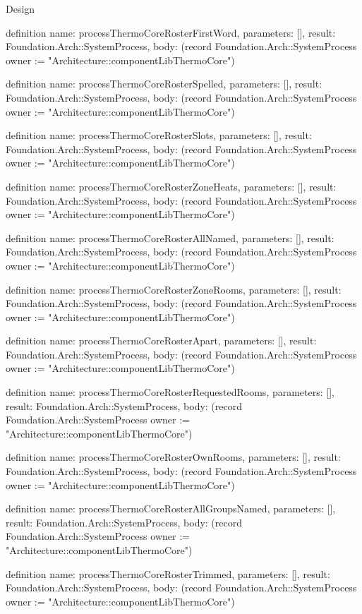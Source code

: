\begin{lexlean}{Design}
\begin{semanticmodule}
definition{
  name: processThermoCoreRosterFirstWord,
  parameters: [],
  result: Foundation.Arch::SystemProcess,
  body: (record Foundation.Arch::SystemProcess {owner := "Architecture::componentLibThermoCore"})
}

definition{
  name: processThermoCoreRosterSpelled,
  parameters: [],
  result: Foundation.Arch::SystemProcess,
  body: (record Foundation.Arch::SystemProcess {owner := "Architecture::componentLibThermoCore"})
}

definition{
  name: processThermoCoreRosterSlots,
  parameters: [],
  result: Foundation.Arch::SystemProcess,
  body: (record Foundation.Arch::SystemProcess {owner := "Architecture::componentLibThermoCore"})
}

definition{
  name: processThermoCoreRosterZoneHeats,
  parameters: [],
  result: Foundation.Arch::SystemProcess,
  body: (record Foundation.Arch::SystemProcess {owner := "Architecture::componentLibThermoCore"})
}

definition{
  name: processThermoCoreRosterAllNamed,
  parameters: [],
  result: Foundation.Arch::SystemProcess,
  body: (record Foundation.Arch::SystemProcess {owner := "Architecture::componentLibThermoCore"})
}

definition{
  name: processThermoCoreRosterZoneRooms,
  parameters: [],
  result: Foundation.Arch::SystemProcess,
  body: (record Foundation.Arch::SystemProcess {owner := "Architecture::componentLibThermoCore"})
}

definition{
  name: processThermoCoreRosterApart,
  parameters: [],
  result: Foundation.Arch::SystemProcess,
  body: (record Foundation.Arch::SystemProcess {owner := "Architecture::componentLibThermoCore"})
}

definition{
  name: processThermoCoreRosterRequestedRooms,
  parameters: [],
  result: Foundation.Arch::SystemProcess,
  body: (record Foundation.Arch::SystemProcess {owner := "Architecture::componentLibThermoCore"})
}

definition{
  name: processThermoCoreRosterOwnRooms,
  parameters: [],
  result: Foundation.Arch::SystemProcess,
  body: (record Foundation.Arch::SystemProcess {owner := "Architecture::componentLibThermoCore"})
}

definition{
  name: processThermoCoreRosterAllGroupsNamed,
  parameters: [],
  result: Foundation.Arch::SystemProcess,
  body: (record Foundation.Arch::SystemProcess {owner := "Architecture::componentLibThermoCore"})
}

definition{
  name: processThermoCoreRosterTrimmed,
  parameters: [],
  result: Foundation.Arch::SystemProcess,
  body: (record Foundation.Arch::SystemProcess {owner := "Architecture::componentLibThermoCore"})
}


\end{semanticmodule}
\end{lexlean}
